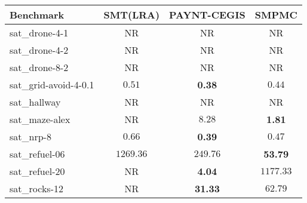 \begin{tabular}{lccc}
\toprule
Benchmark & SMT(LRA) & PAYNT-CEGIS & SMPMC \\
\midrule
sat\_drone-4-1 & NR & NR & NR \\
sat\_drone-4-2 & NR & NR & NR \\
sat\_drone-8-2 & NR & NR & NR \\
sat\_grid-avoid-4-0.1 & $0.51$ & \textbf{0.38} & $0.44$ \\
sat\_hallway & NR & NR & NR \\
sat\_maze-alex & NR & $8.28$ & \textbf{1.81} \\
sat\_nrp-8 & $0.66$ & \textbf{0.39} & $0.47$ \\
sat\_refuel-06 & $1269.36$ & $249.76$ & \textbf{53.79} \\
sat\_refuel-20 & NR & \textbf{4.04} & $1177.33$ \\
sat\_rocks-12 & NR & \textbf{31.33} & $62.79$ \\
\bottomrule
\end{tabular}
